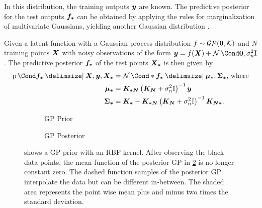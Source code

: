 In this distribution, the training outputs $\bm{y}$ are known.
The predictive posterior for the test outputs $\bm{f_\ast}$ can be obtained by applying the rules for marginalization of multivariate Gaussians, yielding another Gaussian distribution \cite{petersen_matrix_2008}.
\begin{lemma}
    \label{lem:gp_posterior}
    Given a latent function with a Gaussian process distribution $f \sim \operatorname{\mathcal{GP}}(\bm{0}, \operatorname{\mathcal{K}})$ and $N$ training points $\bm{X}$ with noisy observations of the form $\mat{y} = f(\mat{X}) + \Gaussian{\mat{0}, \sigma_n^2 \Eye}$.
    The predictive posterior $\bm{f_\ast}$ of the test points $\bm{X_\ast}$ is then given by
    \begin{align}
        \begin{split}
            \Prob{\mat{f_\ast} \given \mat{X}, \mat{y}, \mat{X_\ast}} &= \Gaussian*{\mat{f_\ast} \given \mat{\mu_\ast}, \mat{\Sigma_\ast}} \text{, where} \\
            \mat{\mu_\ast} &= \mat{K_{\ast N}} \left( \mat{K_N} + \sigma_n^2 \Eye \right)^{-1} \mat{y} \\
            \mat{\Sigma_\ast} &= \mat{K_\ast} - \mat{K_{\ast N}} \left( \mat{K_N} + \sigma_n^2 \Eye \right)^{-1} \mat{K_{N\ast}}.
        \end{split}
    \end{align}
\end{lemma}
\begin{figure}[tb]
    \centering
    \begin{subfigure}{\subfigurewidth}
        \centering
        \caption{GP Prior}
        \label{fig:gp_posterior:prior}
    \end{subfigure}
    \begin{subfigure}{\subfigurewidth}
        \centering
        \caption{GP Posterior}
        \label{fig:gp_posterior:posterior}
    \end{subfigure}
    \caption[GP posterior]{
         shows a GP prior with an RBF kernel.
        After observing the black data points, the mean function of the posterior GP in \cref{fig:gp_posterior:posterior} is no longer constant zero.
        The dashed function samples of the posterior GP interpolate the data but can be different in-between.
        The shaded area represents the point wise mean plus and minus two times the standard deviation.
    }
    \label{fig:gp_posterior}
\end{figure}

